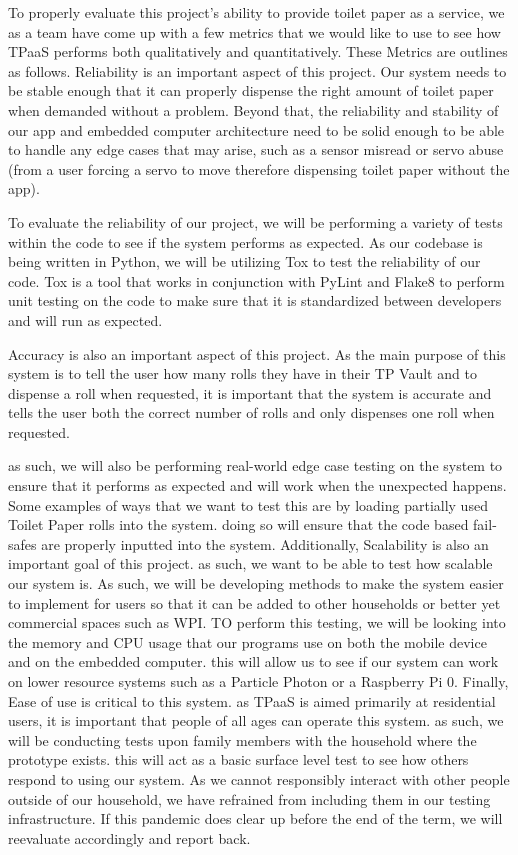 To properly evaluate this project's ability to provide toilet paper as a service, we as a team have come up with a few metrics that we would like to use to see how TPaaS performs both qualitatively and quantitatively. These Metrics are outlines as follows.
Reliability is an important aspect of this project. Our system needs to be stable enough that it can properly dispense the right amount of toilet paper when demanded without a problem. Beyond that, the reliability and stability of our app and embedded computer architecture need to be solid enough to be able to handle any edge cases that may arise, such as a sensor misread or servo abuse (from a user forcing a servo to move therefore dispensing toilet paper without the app).

To evaluate the reliability of our project, we will be performing a variety of tests within the code to see if the system performs as expected. As our codebase is being written in Python, we will be utilizing Tox to test the reliability of our code. Tox is a tool that works in conjunction with PyLint and Flake8 to perform unit testing on the code to make sure that it is standardized between developers and will run as expected. 

Accuracy is also an important aspect of this project. As the main purpose of this system is to tell the user how many rolls they have in their TP Vault and to dispense a roll when requested, it is important that the system is accurate and tells the user both the correct number of rolls and only dispenses one roll when requested.

as such, we will also be performing real-world edge case testing on the system to ensure that it performs as expected and will work when the unexpected happens. Some examples of ways that we want to test this are by loading partially used Toilet Paper rolls into the system. doing so will ensure that the code based fail-safes are properly inputted into the system. 
Additionally, Scalability is also an important goal of this project. as such, we want to be able to test how scalable our system is. As such, we will be developing methods to make the system easier to implement for users so that it can be added to other households or better yet commercial spaces such as WPI. 
TO perform this testing, we will be looking into the memory and CPU usage that our programs use on both the mobile device and on the embedded computer. this will allow us to see if our system can work on lower resource systems such as a Particle Photon or a Raspberry Pi 0.
Finally, Ease of use is critical to this system. as TPaaS is aimed primarily at residential users, it is important that people of all ages can operate this system. as such, we will be conducting tests upon family members with the household where the prototype exists. this will act as a basic surface level test to see how others respond to using our system. As we cannot responsibly interact with other people outside of our household, we have refrained from including them in our testing infrastructure. If this pandemic does clear up before the end of the term, we will reevaluate accordingly and report back.